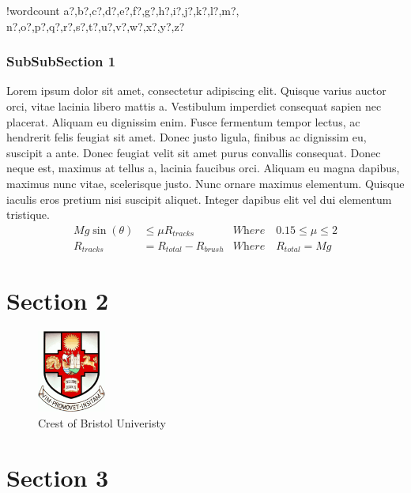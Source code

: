 \documentclass{article}
\newcounter{words}
\newenvironment{counted}{%
  \setcounter{words}{0}
  \SearchList!{wordcount}{\stepcounter{words}}
    {a?,b?,c?,d?,e?,f?,g?,h?,i?,j?,k?,l?,m?,
    n?,o?,p?,q?,r?,s?,t?,u?,v?,w?,x?,y?,z?}
  \UndoBoundary{'}
  \SearchOrder{p;}}{%
  \StopSearching}
\begin{document}
\begin{counted}
\subsubsection{SubSubSection 1}
Lorem ipsum dolor sit amet, consectetur adipiscing elit. Quisque varius auctor orci, vitae lacinia libero mattis a. Vestibulum imperdiet consequat sapien nec placerat. Aliquam eu dignissim enim. Fusce fermentum tempor lectus, ac hendrerit felis feugiat sit amet. Donec justo ligula, finibus ac dignissim eu, suscipit a ante. Donec feugiat velit sit amet purus convallis consequat. Donec neque est, maximus at tellus a, lacinia faucibus orci. Aliquam eu magna dapibus, maximus nunc vitae, scelerisque justo. Nunc ornare maximus elementum. Quisque iaculis eros pretium nisi suscipit aliquet. Integer dapibus elit vel dui elementum tristique.
\begin{align}
Mg\sin { \left( \theta  \right)  } &\le \mu R_{ tracks }&\textit{Where} \quad 0.15 \le \mu \le 2 \\
R_{tracks} &= R_{total}-R_{brush} &\textit{Where} \quad R_{total} = Mg
\label{eq:friciton}
\end{align}

\section{Section 2}
\begin{figure}[H]
  \centering
  \includegraphics[width=0.2\textwidth]{crestbris.png}
  \caption{Crest of Bristol Univeristy}
  \label{fig:BristolCrest}
\end{figure}

\section{Section 3}



\end{counted} %
\end{document}
